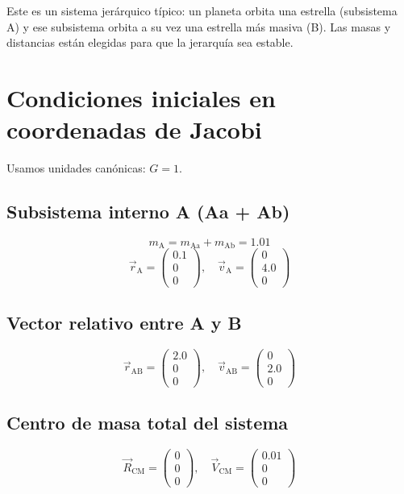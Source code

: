 \documentclass[12pt,oneside]{book}
\begin{document}
\begin{importante}
Este es un sistema jerárquico típico: un planeta orbita una estrella (subsistema A) y ese subsistema orbita a su vez una estrella más masiva (B). Las masas y distancias están elegidas para que la jerarquía sea estable.
\end{importante}

\section{Condiciones iniciales en coordenadas de Jacobi}
Usamos unidades canónicas: \(G = 1\).

\subsection{Subsistema interno A (Aa + Ab)}
\[
m_{\text{A}} = m_{\text{Aa}} + m_{\text{Ab}} = 1.01
\]
\[
\vec{r}_{\text{A}} = \begin{pmatrix} 0.1 \\ 0 \\ 0 \end{pmatrix}, \quad
\vec{v}_{\text{A}} = \begin{pmatrix} 0 \\ 4.0 \\ 0 \end{pmatrix}
\]

\subsection{Vector relativo entre A y B}
\[
\vec{r}_{\text{AB}} = \begin{pmatrix} 2.0 \\ 0 \\ 0 \end{pmatrix}, \quad
\vec{v}_{\text{AB}} = \begin{pmatrix} 0 \\ 2.0 \\ 0 \end{pmatrix}
\]

\subsection{Centro de masa total del sistema}
\[
\vec{R}_{\text{CM}} = \begin{pmatrix} 0 \\ 0 \\ 0 \end{pmatrix}, \quad
\vec{V}_{\text{CM}} = \begin{pmatrix} 0.01 \\ 0 \\ 0 \end{pmatrix}
\]
\end{document}
